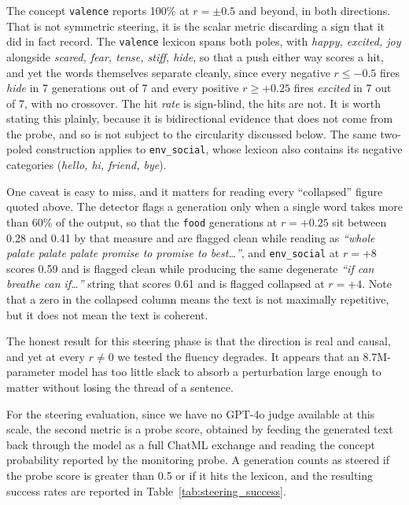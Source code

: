 The concept \verb|valence| reports 100\% at $r = \pm 0.5$ and beyond, in both directions.
That is not symmetric steering, it is the scalar metric discarding a sign that it did in
fact record. The \verb|valence| lexicon spans both poles, with \emph{happy, excited, joy}
alongside \emph{scared, fear, tense, stiff, hide}, so that a push either way scores a hit,
and yet the words themselves separate cleanly, since every negative $r \leq -0.5$ fires
\emph{hide} in 7 generations out of 7 and every positive $r \geq +0.25$ fires
\emph{excited} in 7 out of 7, with no crossover. The hit \emph{rate} is sign-blind, the
hits are not. It is worth stating this plainly, because it is bidirectional evidence that
does not come from the probe, and so is not subject to the circularity discussed below.
The same two-poled construction applies to \verb|env_social|, whose lexicon also contains
its negative categories (\emph{hello, hi, friend, bye}).

One caveat is easy to miss, and it matters for reading every ``collapsed'' figure quoted
above. The detector flags a generation only when a single word takes more than 60\% of the
output, so that the \verb|food| generations at $r = +0.25$ sit between 0.28 and 0.41 by
that measure and are flagged clean while reading as
\emph{``whole palate palate palate promise to promise to best\ldots''}, and
\verb|env_social| at $r = +8$ scores 0.59 and is flagged clean while producing the same
degenerate \emph{``if can breathe can if\ldots''} string that scores 0.61 and is flagged
collapsed at $r = +4$. Note that a zero in the collapsed column means the text is not
maximally repetitive, but it does not mean the text is coherent.

The honest result for this steering phase is that the direction is real and causal, and
yet at every $r \neq 0$ we tested the fluency degrades. It appears that an
8.7M-parameter model has too little slack to absorb a perturbation large enough to matter
without losing the thread of a sentence.

For the steering evaluation, since we have no GPT-4o judge available at this scale, the
second metric is a probe score, obtained by feeding the generated text back through the
model as a full ChatML exchange and reading the concept probability reported by the
monitoring probe. A generation counts as steered if the probe score is greater than 0.5 or
if it hits the lexicon, and the resulting success rates are reported in
Table~\ref{tab:steering_success}.

